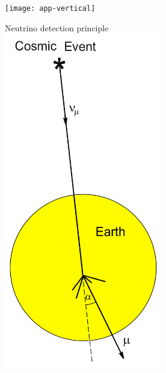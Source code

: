 \Tr
\twocolumn
\begin{center}
\texttt{[image: app-vertical]}
\end{center}

\newpage

\begin{center}
{\blue Neutrino detection principle}\\
\includegraphics[keepaspectratio,height=14.7cm]{earth-shield}
\end{center}
